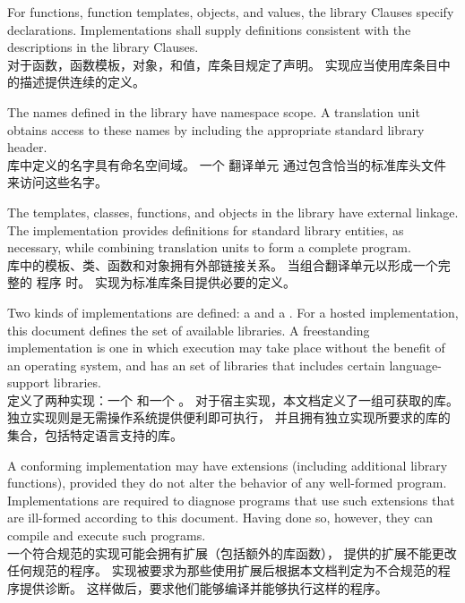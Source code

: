 \pnum
For functions, function templates, objects, and values, the library
Clauses specify declarations. Implementations shall supply definitions
consistent with the descriptions in the library Clauses. \\
对于函数，函数模板，对象，和值，库条目规定了声明。
实现应当使用库条目中的描述提供连续的定义。

\pnum
The names defined in the library have namespace
scope. A \Cpp{}  translation
unit obtains access to these names by including the
appropriate standard library header. \\
库中定义的名字具有命名空间域。
一个 \Cpp{} 翻译单元 
通过包含恰当的标准库头文件 来访问这些名字。

\pnum
The templates, classes, functions, and objects in the library have
external linkage. The implementation provides
definitions for standard library entities, as necessary, while combining
translation units to form a complete \Cpp{}  program.%
 \\
库中的模板、类、函数和对象拥有外部链接关系。
当组合翻译单元以形成一个完整的 \Cpp{} 程序 时。
实现为标准库条目提供必要的定义。

\pnum
Two kinds of implementations are defined: a  and a
. For a hosted implementation, this
document defines the set of available libraries. A freestanding
implementation is one in which execution may take place without the benefit of
an operating system, and has an  set of libraries that includes certain language-support
libraries. \\
定义了两种实现：一个  
和一个 。
对于宿主实现，本文档定义了一组可获取的库。独立实现则是无需操作系统提供便利即可执行，
并且拥有独立实现所要求的库的集合，包括特定语言支持的库。

\pnum
A conforming implementation may have extensions (including
additional library functions), provided they do not alter the
behavior of any well-formed program.
Implementations are required to diagnose programs that use such
extensions that are ill-formed according to this document.
Having done so, however, they can compile and execute such programs. \\
一个符合规范的实现可能会拥有扩展（包括额外的库函数），
提供的扩展不能更改任何规范的程序。
实现被要求为那些使用扩展后根据本文档判定为不合规范的程序提供诊断。
这样做后，要求他们能够编译并能够执行这样的程序。

